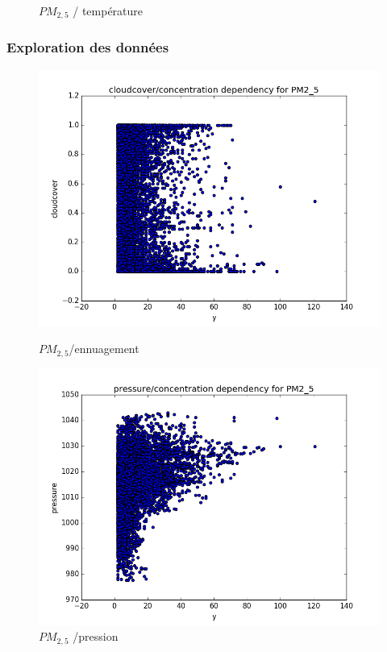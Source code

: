 \documentclass{beamer}
\begin{document}
\begin{frame}
\begin{figure}[H]
  \caption{$PM_{2,5}$ / température}
	\endminipage\hfill
\end{figure}
\end{frame}

\begin{frame}
  \frametitle{Exploration des données}
\begin{figure}[H]
	\captionsetup{labelformat=empty}
	\includegraphics[width=\linewidth]{images/PM2_5_cloud_y.png}
  \caption{$PM_{2,5}$/ennuagement}
	\endminipage\hfill
	\includegraphics[width=\linewidth]{images/PM2_5_pressure_y.png}
  \caption{$PM_{2,5}$ /pression}
	\endminipage\hfill

\end{figure}
\end{frame}
\end{document}

